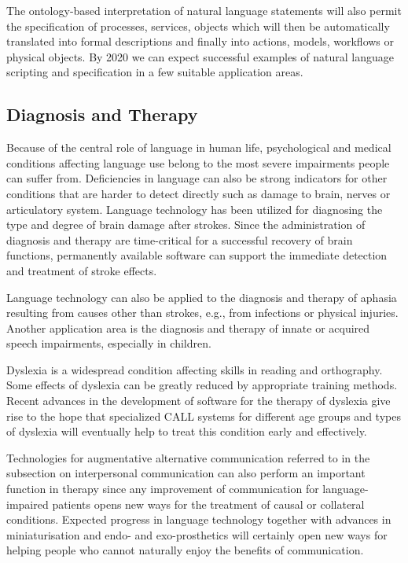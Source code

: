 \begin{multicols}{2}
The ontology-based interpretation of natural language statements will also permit the specification of processes, services, objects which will then be automatically translated into formal descriptions and finally into actions, models, workflows or physical objects.  By 2020 we can expect successful examples of natural language scripting and specification in a few suitable application areas.

\subsection{Diagnosis and Therapy}
\label{sec:diagnosis-therapy}

Because of the central role of language in human life, psychological and medical conditions affecting language use belong to the most severe impairments people can suffer from. Deficiencies in language can also be strong indicators for other conditions that are harder to detect directly such as damage to brain, nerves or articulatory system. Language technology has been utilized for diagnosing the type and degree of brain damage after strokes. Since the administration of diagnosis and therapy are time-critical for a successful recovery of brain functions, permanently available software can support the immediate detection and treatment of stroke effects.
 
Language technology can also be applied to the diagnosis and therapy of aphasia resulting from causes other than strokes, e.g., from infections or physical injuries. Another application area is the diagnosis and therapy of innate or acquired speech impairments, especially in children. 
 
Dyslexia is a widespread condition affecting skills in reading and orthography. Some effects of dyslexia can be greatly reduced by appropriate training methods. Recent advances in the development of software for the therapy of dyslexia give rise to the hope that specialized CALL systems for different age groups and types of dyslexia will eventually help to treat this condition early and effectively.
 
Technologies for augmentative alternative communication referred to in the subsection on interpersonal communication can also perform an important function in therapy since any improvement of communication for language-impaired patients opens new ways for the treatment of causal or collateral conditions. Expected progress in language technology together with advances in miniaturisation and endo- and exo-prosthetics will certainly open new ways for helping people who cannot naturally enjoy the benefits of communication.


\end{multicols}
